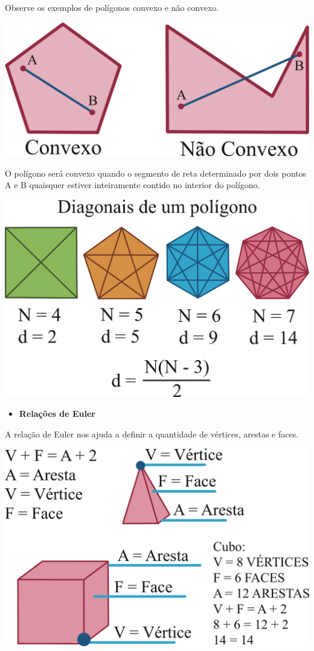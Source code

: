 {Observe os exemplos de polígonos convexo e não convexo.

\noindent\includegraphics[width=\textwidth]{./ilustras-mat/modulo_10-poligonos.png}

O polígono será convexo quando o segmento de reta determinado por dois pontos A e B
quaisquer estiver inteiramente contido no interior do polígono. 

\noindent\includegraphics[width=\textwidth]{./ilustras-mat/modulo_10-poligonos_diagonais.png}

\begin{itemize}
  \item \textbf{Relações de Euler}
\end{itemize}

A relação de Euler nos ajuda a definir a quantidade de vértices, arestas
e faces.

\includegraphics[width=\textwidth]{./ilustras-mat/modulo_10-relacoes_de_euler.png}

}
